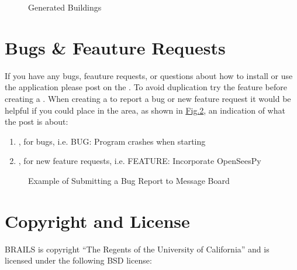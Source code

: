 \documentclass[letterpaper,10pt,english]{sphinxmanual}
\begin{document}
\begin{figure}[htbp]
\centering
\capstart

\noindent{}
\caption{Generated Buildings}\label{\detokenize{common/user_manual/examples:id4}}\end{figure}


\section{Bugs \& Feauture Requests}
\label{\detokenize{common/user_manual/bugs:bugs-feauture-requests}}\label{\detokenize{common/user_manual/bugs:lblbugs}}\label{\detokenize{common/user_manual/bugs::doc}}
\sphinxAtStartPar
If you have any bugs, feauture requests, or questions about how to
install or use the application please post on the .
To avoid duplication try the  feature before creating a .
When creating a  to report a bug or new feature request it would be helpful
if you could place in the  area, as shown in \hyperref[\detokenize{common/user_manual/bugs:figbugreport}]{Fig.\@ \ref{\detokenize{common/user_manual/bugs:figbugreport}}}, an indication of what the post is about:
\begin{enumerate}
%
\item {} 
\sphinxAtStartPar
{}, for bugs, i.e. BUG: Program crashes when starting

\item {} 
\sphinxAtStartPar
{}, for new feature requests, i.e. FEATURE: Incorporate OpenSeesPy

\end{enumerate}

\begin{figure}[htbp]
\centering
\capstart

\noindent{}
\caption{Example of Submitting a Bug Report to Message Board}\label{\detokenize{common/user_manual/bugs:id1}}\label{\detokenize{common/user_manual/bugs:figbugreport}}\end{figure}


\section{Copyright and License}
\label{\detokenize{common/license:copyright-and-license}}\label{\detokenize{common/license:lbllicense}}\label{\detokenize{common/license::doc}}
\sphinxAtStartPar
BRAILS is copyright “The Regents of the University of California” and is licensed under the following BSD license:
\end{document}
